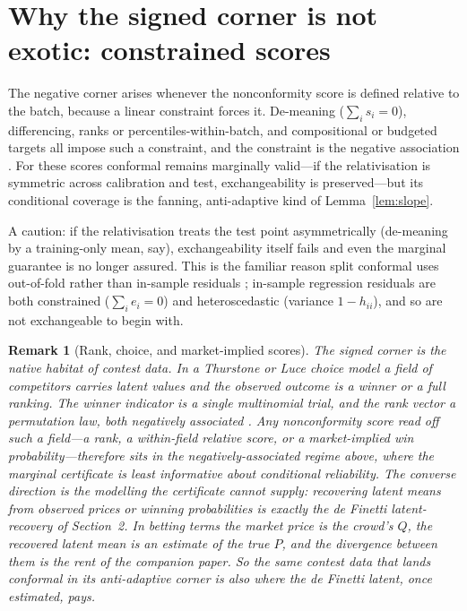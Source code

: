 \documentclass[11pt]{article}
\newtheorem{remark}{Remark}
\begin{document}
\section{Why the signed corner is not exotic: constrained scores}

The negative corner arises whenever the nonconformity score is defined relative to the
batch, because a linear constraint forces it. De-meaning ($\sum_i s_i=0$), differencing,
ranks or percentiles-within-batch, and compositional or budgeted targets all impose such a
constraint, and the constraint is the negative association \citep{joagdev1983}. For
these scores conformal remains marginally valid---if the relativisation is symmetric across
calibration and test, exchangeability is preserved---but its conditional coverage is the
fanning, anti-adaptive kind of Lemma~\ref{lem:slope}.

A caution: if the relativisation treats the test point asymmetrically (de-meaning by a
training-only mean, say), exchangeability itself fails and even the marginal guarantee is no
longer assured. This is the familiar reason split conformal uses out-of-fold rather than
in-sample residuals \citep{lei2018}; in-sample regression residuals are both constrained
($\sum_i e_i=0$) and heteroscedastic (variance $1-h_{ii}$), and so are not exchangeable to
begin with.

\begin{remark}[Rank, choice, and market-implied scores]
The signed corner is the native habitat of contest data. In a Thurstone or Luce choice model a
field of competitors carries latent values and the observed outcome is a winner or a full
ranking. The winner indicator is a single multinomial trial, and the rank vector a
permutation law, both negatively associated \citep{joagdev1983}. Any nonconformity score
read off such a field---a rank, a within-field relative score, or a market-implied win
probability---therefore sits in the negatively-associated regime above, where the marginal
certificate is least informative about conditional reliability. The converse direction is the
modelling the certificate cannot supply: recovering latent means from observed prices or
winning probabilities \citep{cotton_horserace} is exactly the de Finetti latent-recovery of
Section~2. In betting terms the market price is the crowd's $Q$, the recovered latent mean is an
estimate of the true $P$, and the divergence between them is the rent of the companion paper.
So the same contest data that lands conformal in its anti-adaptive corner is also where the de
Finetti latent, once estimated, pays.
\end{remark}
\end{document}
